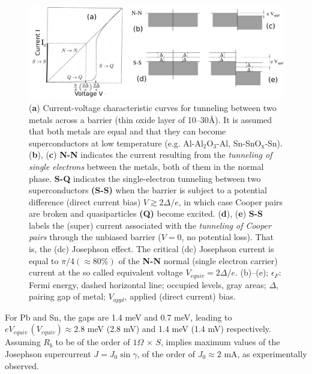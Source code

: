   \begin{figure}
  	\centerline{\includegraphics[width=17cm]{C6/figs_C6/fig4_6_1x}}
  	\caption{(\textbf{a}) Current-voltage characteristic curves for tunneling between two metals across a barrier (thin oxide layer of 10--30\AA). It is assumed that both metals are  equal and that they can become superconductors at low temperature (e.g. Al-Al$_2$O$_3$-Al, Sn-SnO$_\text{x}$-Sn). (\textbf{b}), (\textbf{c}) \textbf{N-N} indicates the  current resulting from the \textit{tunneling of single electrons} between the metals, both of them in the normal phase. \textbf{S-Q} indicates the single-electron tunneling between two superconductors \textbf{(S-S)} when the barrier is subject to a potential difference (direct current bias) $V\gtrsim2\Delta/e$, in which case Cooper pairs are broken and quasiparticles \textbf{(Q)} become excited. (\textbf{d}),  (\textbf{e}) \textbf{S-S} labels the (super) current associated with the \textit{tunneling of Cooper pairs} through the unbiased barrier ($V=0$, no potential loss). That is, the (dc) Josephson effect. The critical (dc) Josephson current  is equal to $\pi/4(\approx80\%)$ of the \textbf{N-N}  normal (single electron carrier) current at the so called equivalent  voltage $V_{equiv}=2\Delta/e$. (b)--(e); $\epsilon_F$: Fermi energy, dashed horizontal line; occupied levels, gray areas; $\Delta$, pairing gap of metal; $V_{appl}$, applied (direct current) bias.}\label{fig4.6.1}
  \end{figure}
  
  For Pb and Sn, the gaps are 1.4 meV and 0.7 meV, leading to $e V_{equiv} \,(V_{equiv})\approx 2.8$ meV (2.8 mV) and 1.4 meV (1.4 mV) respectively. Assuming $R_b$ to be of the order of $1\Omega\,\times\, S$, implies maximum values of the Josephson supercurrent $J=J_0\sin\gamma$, of the order of $J_0\approx 2$ mA, as experimentally observed.
 
